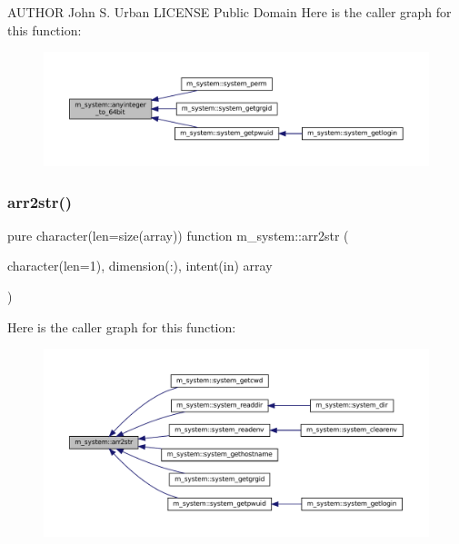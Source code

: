 A\+U\+T\+H\+OR John S. Urban L\+I\+C\+E\+N\+SE Public Domain Here is the caller graph for this function\+:
\nopagebreak
\begin{figure}[H]
\begin{center}
\leavevmode
\includegraphics[width=350pt]{namespacem__system_a151da54be39dddcf270cceeff3243438_icgraph}
\end{center}
\end{figure}
\mbox{\label{namespacem__system_aeb3d7d4cb39d59917910a3ae2532206d}} 
\subsubsection{\texorpdfstring{arr2str()}{arr2str()}}
{\footnotesize\ttfamily pure character(len=size(array)) function m\+\_\+system\+::arr2str (\begin{DoxyParamCaption}\item[{character(len=1), dimension(\+:), intent(in)}]{array }\end{DoxyParamCaption})\hspace{0.3cm}{\ttfamily [private]}}

Here is the caller graph for this function\+:
\nopagebreak
\begin{figure}[H]
\begin{center}
\leavevmode
\includegraphics[width=350pt]{namespacem__system_aeb3d7d4cb39d59917910a3ae2532206d_icgraph}
\end{center}
\end{figure}
\mbox{\label{namespacem__system_aa7c5445619aa15cd2301fe17f7c3b73c}} 
